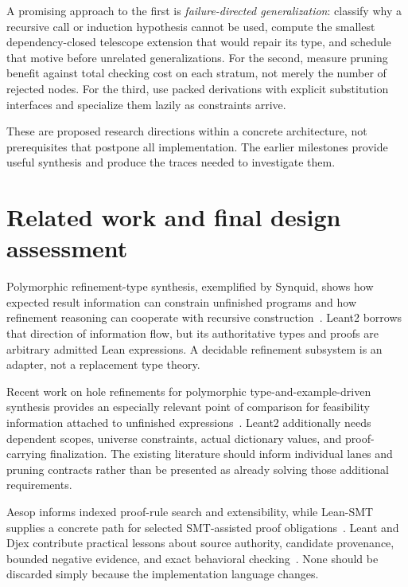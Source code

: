 \documentclass[11pt,letterpaper]{article}
\theoremstyle{definition}
\theoremstyle{remark}
\begin{document}
A promising approach to the first is \emph{failure-directed generalization}: classify why a recursive call or induction hypothesis cannot be used, compute the smallest dependency-closed telescope extension that would repair its type, and schedule that motive before unrelated generalizations. For the second, measure pruning benefit against total checking cost on each stratum, not merely the number of rejected nodes. For the third, use packed derivations with explicit substitution interfaces and specialize them lazily as constraints arrive.

These are proposed research directions within a concrete architecture, not prerequisites that postpone all implementation. The earlier milestones provide useful synthesis and produce the traces needed to investigate them.

\section{Related work and final design assessment}
\label{sec:related}

Polymorphic refinement-type synthesis, exemplified by Synquid, shows how expected result information can constrain unfinished programs and how refinement reasoning can cooperate with recursive construction~\cite{synquid,refinementlecture}. Leant2 borrows that direction of information flow, but its authoritative types and proofs are arbitrary admitted Lean expressions. A decidable refinement subsystem is an adapter, not a replacement type theory.

Recent work on hole refinements for polymorphic type-and-example-driven synthesis provides an especially relevant point of comparison for feasibility information attached to unfinished expressions~\cite{holerefine}. Leant2 additionally needs dependent scopes, universe constraints, actual dictionary values, and proof-carrying finalization. The existing literature should inform individual lanes and pruning contracts rather than be presented as already solving those additional requirements.

Aesop informs indexed proof-rule search and extensibility, while Lean-SMT supplies a concrete path for selected SMT-assisted proof obligations~\cite{aesop,leansmt}. Leant and Djex contribute practical lessons about source authority, candidate provenance, bounded negative evidence, and exact behavioral checking~\cite{internals,djexarch,behavior}. None should be discarded simply because the implementation language changes.
\end{document}
